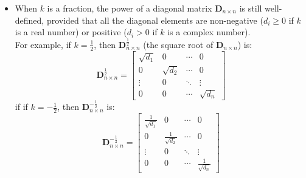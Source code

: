 \documentclass[oneside]{book}
\begin{document}
{{\begin{itemize}
\[\begin{bmatrix}
                    \end{bmatrix}
                    =
                    \begin{bmatrix}
                        \frac{1}{d_{1}^{k}} & 0                   & \cdots & 0\\
                        0                   & \frac{1}{d_{2}^{k}} & \cdots & 0\\
                        \vdots              & 0                   & \ddots & \vdots\\
                        0                   & 0                   & \cdots & \frac{1}{d_{n}^{k}}
                    \end{bmatrix}
            \]
            \item When $k$ is a fraction, the power of a diagonal matrix $\mathbf{D}_{n \times n}$ is still well-defined, provided that all the diagonal elements are non-negative ($d_{i}\geq0$ if $k$ is a real number) or positive ($d_{i}>0$ if $k$ is a complex number).\\
            For example, if $k=\frac{1}{2}$, then $\mathbf{D}_{n \times n}^{\frac{1}{2}}$ (the square root of
            $\mathbf{D}_{n \times n}$) is:
            \[
                \mathbf{D}_{n \times n}^{\frac{1}{2}}=
                \begin{bmatrix}
                    \sqrt{d_{1}} & 0            & \cdots & 0\\
                    0            & \sqrt{d_{2}} & \cdots & 0\\
                    \vdots       & 0            & \ddots & \vdots\\
                    0            & 0            & \cdots & \sqrt{d_{n}}
                \end{bmatrix}
            \]
            if if $k=-\frac{1}{2}$, then $\mathbf{D}_{n \times n}^{-\frac{1}{2}}$ is:
            \[
                \mathbf{D}_{n \times n}^{-\frac{1}{2}}=
                \begin{bmatrix}
                    \frac{1}{\sqrt{d_{1}}} & 0                      & \cdots & 0\\
                    0                      & \frac{1}{\sqrt{d_{2}}} & \cdots & 0\\
                    \vdots                 & 0                      & \ddots & \vdots\\
                    0                      & 0                      & \cdots & \frac{1}{\sqrt{d_{n}}}
                \end{bmatrix}
            \]
        \end{itemize}
    }
}
\end{document}
